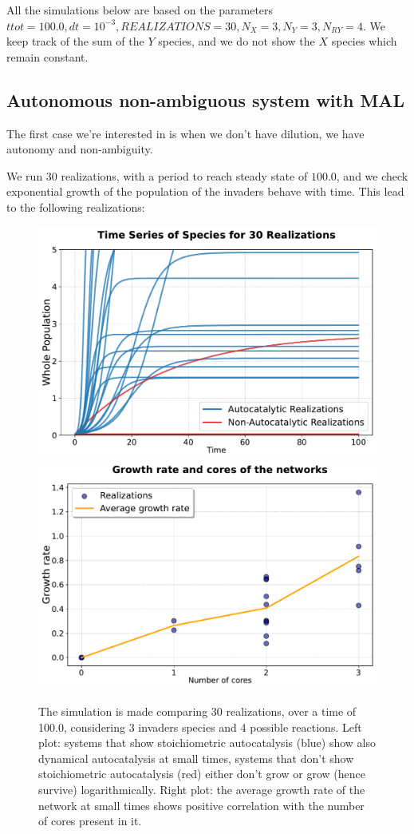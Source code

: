 \documentclass{article}
\begin{document}
All the simulations below are based on the parameters $ttot = 100.0, dt = 10^{-3}, REALIZATIONS = 30, N_X = 3, N_Y = 3, N_{RY} = 4.$ We keep track of the sum of the $Y$ species, and we do not show the $X$ species which remain constant.

\subsection{Autonomous non-ambiguous system with MAL}

The first case we're interested in is when we 
don't have dilution, we have autonomy and non-ambiguity.

\begin{flushleft}
We run $30$ realizations, with a period to reach steady state of $100.0$, and we check exponential growth of the population of the invaders behave with time. This lead to the following realizations:   
\end{flushleft}

\begin{figure}[H]
    \centering
    \includegraphics[width=0.45\linewidth]{traj_large_dil_elegant.pdf} 
   \includegraphics[width=0.45\linewidth]{growth_filtered.pdf} 
   \caption{\small{The simulation is made comparing 30 realizations, over a time of 100.0, considering 3 invaders species and 4 possible reactions. Left plot: systems that show stoichiometric autocatalysis (blue) show also dynamical autocatalysis at small times, systems that don't show stoichiometric autocatalysis (red) either don't grow or grow (hence survive) logarithmically. Right plot: the average growth rate of the network at small times shows positive correlation with the number of cores present in it.}}
    \label{Fig. 1}
\end{figure}
\end{document}
